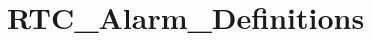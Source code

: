 \hypertarget{group___r_t_c___alarm___definitions}{\section{R\-T\-C\-\_\-\-Alarm\-\_\-\-Definitions}
\label{group___r_t_c___alarm___definitions}
}
